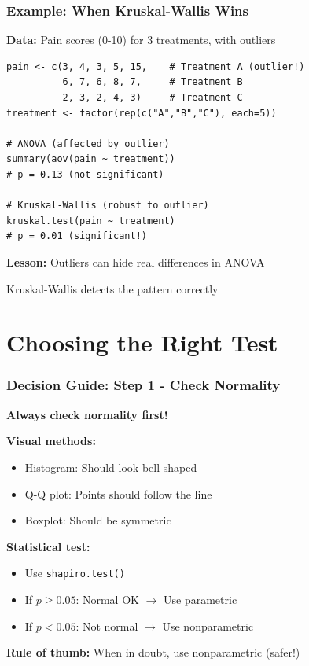 \documentclass{beamer}
\begin{document}
\begin{frame}[fragile]
\frametitle{Example: When Kruskal-Wallis Wins}
\textbf{Data:} Pain scores (0-10) for 3 treatments, with outliers

\vspace{0.3cm}
\begin{small}
\begin{verbatim}
pain <- c(3, 4, 3, 5, 15,    # Treatment A (outlier!)
          6, 7, 6, 8, 7,     # Treatment B
          2, 3, 2, 4, 3)     # Treatment C
treatment <- factor(rep(c("A","B","C"), each=5))

# ANOVA (affected by outlier)
summary(aov(pain ~ treatment))
# p = 0.13 (not significant)

# Kruskal-Wallis (robust to outlier)
kruskal.test(pain ~ treatment)
# p = 0.01 (significant!)
\end{verbatim}
\end{small}

\textbf{Lesson:} Outliers can hide real differences in ANOVA

Kruskal-Wallis detects the pattern correctly
\end{frame}

\section{Choosing the Right Test}

\begin{frame}
\frametitle{Decision Guide: Step 1 - Check Normality}

\textbf{Always check normality first!}

\vspace{0.3cm}
\textbf{Visual methods:}
\begin{itemize}
\item Histogram: Should look bell-shaped
\item Q-Q plot: Points should follow the line
\item Boxplot: Should be symmetric
\end{itemize}

\vspace{0.3cm}
\textbf{Statistical test:}
\begin{itemize}
\item Use \texttt{shapiro.test()}
\item If $p \geq 0.05$: Normal OK $\rightarrow$ Use parametric
\item If $p < 0.05$: Not normal $\rightarrow$ Use nonparametric
\end{itemize}

\vspace{0.3cm}
\textbf{Rule of thumb:} When in doubt, use nonparametric (safer!)
\end{frame}
\end{document}
